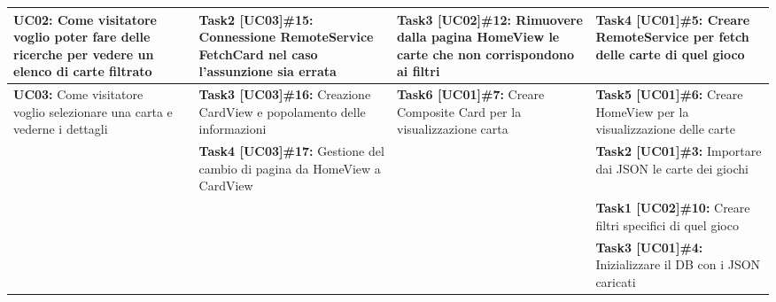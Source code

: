 \documentclass{article}
\begin{document}
\begin{itemize}
\begin{tabular}{ | p{2.4cm} | p{1.4cm} | p{2.7cm} | p{3.4cm} | p{3cm} | }
            \hline
            \textbf{UC02:} Come visitatore voglio poter fare delle ricerche per vedere un elenco di carte filtrato
            & & \textbf{Task2 [UC03]\#15:} Connessione RemoteService FetchCard nel caso l'assunzione sia errata
            & \textbf{Task3 [UC02]\#12:} Rimuovere dalla pagina HomeView le carte che non corrispondono ai filtri
            & \textbf{Task4 [UC01]\#5:} Creare RemoteService per fetch delle carte di quel gioco \\
            \hline
            \textbf{UC03:} Come visitatore voglio selezionare una carta e vederne i dettagli
            & & \textbf{Task3 [UC03]\#16:} Creazione CardView e popolamento delle informazioni
            & \textbf{Task6 [UC01]\#7:} Creare Composite Card per la visualizzazione carta
            & \textbf{Task5 [UC01]\#6:} Creare HomeView per la visualizzazione delle carte \\
            \hline
            & & \textbf{Task4 [UC03]\#17:} Gestione del cambio di pagina da HomeView a CardView
            & & \textbf{Task2 [UC01]\#3:} Importare dai JSON le carte dei giochi \\
            \hline
            & & & & \textbf{Task1 [UC02]\#10:} Creare filtri specifici di quel gioco  \\
            \hline
            & & & & \textbf{Task3 [UC01]\#4:} Inizializzare il DB con i JSON caricati \\
            \hline
        \end{tabular}
    \end{itemize}
\end{document}
